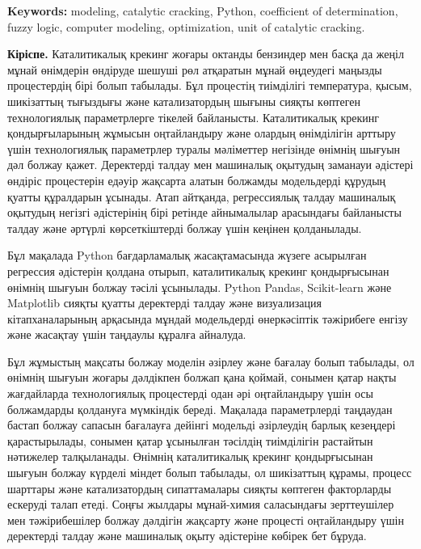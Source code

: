 {\bfseries Keywords:} modeling, catalytic cracking, Python, coefficient of
determination, fuzzy logic, computer modeling, optimization, unit of
catalytic cracking.

\begin{multicols}{2}
{\bfseries Кіріспе.} Каталитикалық крекинг жоғары октанды бензиндер мен
басқа да жеңіл мұнай өнімдерін өндіруде шешуші рөл атқаратын мұнай
өңдеудегі маңызды процестердің бірі болып табылады. Бұл процестің
тиімділігі температура, қысым, шикізаттың тығыздығы және катализатордың
шығыны сияқты көптеген технологиялық параметрлерге тікелей байланысты.
Каталитикалық крекинг қондырғыларының жұмысын оңтайландыру және олардың
өнімділігін арттыру үшін технологиялық параметрлер туралы мәліметтер
негізінде өнімнің шығуын дәл болжау қажет. Деректерді талдау мен
машиналық оқытудың заманауи әдістері өндіріс процестерін едәуір жақсарта
алатын болжамды модельдерді құрудың қуатты құралдарын ұсынады. Атап
айтқанда, регрессиялық талдау машиналық оқытудың негізгі әдістерінің
бірі ретінде айнымалылар арасындағы байланысты талдау және әртүрлі
көрсеткіштерді болжау үшін кеңінен қолданылады.

Бұл мақалада Python бағдарламалық жасақтамасында жүзеге асырылған
регрессия әдістерін қолдана отырып, каталитикалық крекинг қондырғысынан
өнімнің шығуын болжау тәсілі ұсынылады. Python Pandas, Scikit-learn және
Matplotlib сияқты қуатты деректерді талдау және визуализация
кітапханаларының арқасында мұндай модельдерді өнеркәсіптік тәжірибеге
енгізу және жасақтау үшін таңдаулы құралға айналуда.

Бұл жұмыстың мақсаты болжау моделін әзірлеу және бағалау болып табылады,
ол өнімнің шығуын жоғары дәлдікпен болжап қана қоймай, сонымен қатар
нақты жағдайларда технологиялық процестерді одан әрі оңтайландыру үшін
осы болжамдарды қолдануға мүмкіндік береді. Мақалада параметрлерді
таңдаудан бастап болжау сапасын бағалауға дейінгі модельді әзірлеудің
барлық кезеңдері қарастырылады, сонымен қатар ұсынылған тәсілдің
тиімділігін растайтын нәтижелер талқыланады. Өнімнің каталитикалық
крекинг қондырғысынан шығуын болжау күрделі міндет болып табылады, ол
шикізаттың құрамы, процесс шарттары және катализатордың сипаттамалары
сияқты көптеген факторларды ескеруді талап етеді. Соңғы жылдары
мұнай-химия саласындағы зерттеушілер мен тәжірибешілер болжау дәлдігін
жақсарту және процесті оңтайландыру үшін деректерді талдау және
машиналық оқыту әдістеріне көбірек бет бұруда.


\end{multicols}
